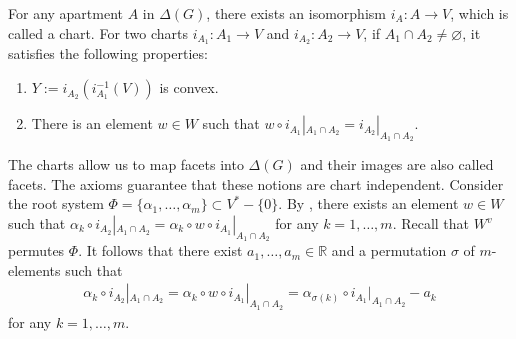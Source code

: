 \documentclass[11pt,a4paper,english]{smfart}
\theoremstyle{plain}
\theoremstyle{definition}
\theoremstyle{plain}
\def\bR{\mathbb{R}}
\begin{document}
	
For any apartment $A$ in $ \Delta(G)$,  there exists an isomorphism $i_A:A\to V$, which is  called a chart. For two charts $i_{A_1}:A_1\to V$ and $i_{A_2}:A_2\to V$, if $A_1\cap A_2\neq\varnothing$,   it satisfies the following properties:
	\begin{enumerate}[label=(\alph*)]
		\item $Y:=i_{A_2}(i_{A_1}^{-1}(V))$ is convex.
		\item \label{item:weyl}There is an element $w\in W$ such that $w\circ i_{A_1}|_{A_1\cap A_2}=i_{A_2}|_{A_1\cap A_2}$.
	\end{enumerate} 
	The charts allow us to map facets into $\Delta(G)$ and their images are
	also called facets. The  axioms guarantee that these
	notions are chart independent. 
	\iffalse
   Consider the root system $\Phi=\{\alpha_1,\ldots,\alpha_m\}\subset V^*-\{0\}$.  %
		By , there exists an element $w\in W$ such that  
		$
		\alpha_k\circ i_{A_2}|_{A_1\cap A_2}=  \alpha_k\circ w\circ i_{A_1}|_{A_1\cap A_2} 
		$ 
		for any $k=1,\ldots,m$. 
		Recall that $W^v$ permutes $\Phi$. It follows that there exist $a_1,\ldots,a_m\in \bR$ 
		and  a permutation $\sigma$ of $m$-elements   such that
\begin{align}\label{eq:compatible} 
	 	\alpha_k\circ i_{A_2}|_{A_1\cap A_2}=  \alpha_k\circ w\circ i_{A_1}|_{A_1\cap A_2} = \alpha_{\sigma(k)}\circ i_{A_1}|_{A_1\cap A_2} -a_k
\end{align} 
		for any $k=1,\ldots,m$.  
		
\end{document}

